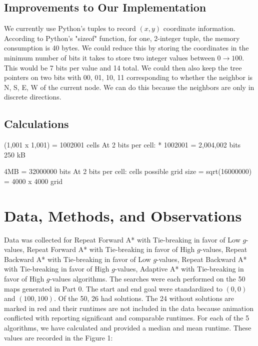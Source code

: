 \documentclass[a4paper,12pt]{article}
\begin{document}
\subsection{Improvements to Our Implementation}
We currently use Python's tuples to record $(x , y)$ coordinate information. According to Python's "sizeof" function, for one, 2-integer tuple, the memory consumption is 40 bytes. We could reduce this by storing the coordinates in the minimum number of bits it takes to store two integer values between $0 \rightarrow 100$. This would be 7 bits per value and 14 total. We could then also keep the tree pointers on two bits with 00, 01, 10, 11 corresponding to whether the neighbor is N, S, E, W of the current node. We can do this because the neighbors are only in discrete directions. 

\subsection{Calculations}
(1,001 x 1,001) = 1002001 cells \newline
At 2 bits per cell:  * 1002001  = 2,004,002 bits ~ 250 kB \newline \newline

4MB = 32000000 bits \newline
At 2 bits per cell:  cells possible \newline 
	grid size = sqrt(16000000) = 4000 x 4000 grid

\section{Data, Methods, and Observations}

Data was collected for Repeat Forward A* with Tie-breaking in favor of Low $g$-values, Repeat Forward A* with Tie-breaking in favor of High $g$-values,  Repeat Backward A* with Tie-breaking in favor of Low $g$-values, Repeat Backward A* with Tie-breaking in favor of High $g$-values, Adaptive A* with Tie-breaking in favor of High $g$-values algorithms. The searches were each performed on the 50 maps generated in Part 0. The start and end goal were standardized to $(0,0)$ and $(100,100)$. Of the 50, 26 had solutions. The 24 without solutions are marked in red and their runtimes are not included in the data because animation conflicted with reporting significant and comparable runtimes. For each of the 5 algorithms, we have calculated and provided a median and mean runtime. These values are recorded in the Figure 1:
\end{document}
